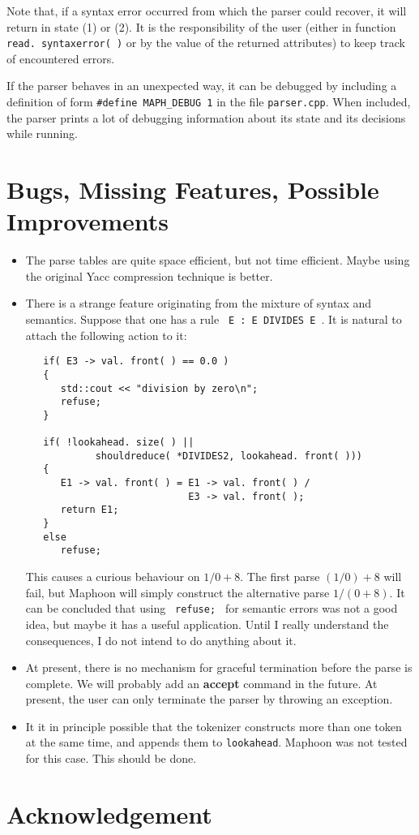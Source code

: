 \documentclass{article}
\begin{document}
\noindent
Note that, if a syntax error occurred from which the parser could
recover, it will return in state (1) or (2). It is the responsibility
of the user (either in function \verb+read. syntaxerror( )+ or by
the value of the returned attributes) to keep track
of encountered errors.

If the parser behaves in an unexpected way, it can be
debugged by including a definition of form
\verb+#define MAPH_DEBUG 1+ in the file
\verb+parser.cpp+. 
When included, the parser prints a lot of debugging information
about its state and its decisions while running.

\section{Bugs, Missing Features, Possible Improvements}

\begin{itemize}
\item  
   The parse tables are quite space efficient, but not time efficient.
   Maybe using the original Yacc compression technique is better.
\item
   There is a strange feature originating from the mixture of syntax
   and semantics. Suppose that one has a rule 
   \verb+ E : E DIVIDES E +. It is natural to attach the following
   action to it:

\begin{verbatim}
   if( E3 -> val. front( ) == 0.0 )
   {
      std::cout << "division by zero\n";
      refuse;
   }

   if( !lookahead. size( ) || 
            shouldreduce( *DIVIDES2, lookahead. front( )))
   {
      E1 -> val. front( ) = E1 -> val. front( ) / 
                            E3 -> val. front( );
      return E1;
   }
   else
      refuse;
\end{verbatim}

   \noindent
   This causes a curious behaviour on $ 1 / 0 + 8. $ 
   The first parse $ (1/0)+8 $ will fail, but Maphoon will simply construct
   the alternative parse $ 1 / ( 0 + 8 ). $ 
   It can be concluded that using \verb+ refuse; + for semantic errors was
   not a good idea, but maybe it has a useful application.
   Until I really understand the consequences, I do not intend to do 
   anything about it.

\item 
   At present, there is no mechanism for graceful termination before
   the parse is complete. We will probably add an {\bf accept} command in the
   future. At present, the user can only terminate the parser by 
   throwing an exception. 

\item
   It it in principle possible that the tokenizer constructs more than
   one token at the same time, and appends them to \verb+lookahead+.
   Maphoon was not tested for this case. This should be done. 

\end{itemize}

\section{Acknowledgement}
\end{document}
